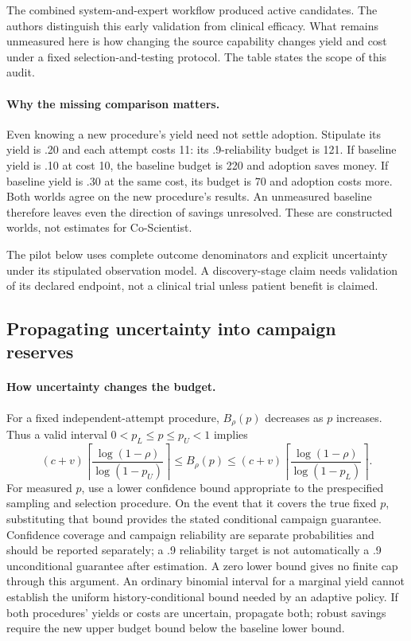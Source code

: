 The combined system-and-expert workflow produced active candidates. The authors distinguish this early validation from clinical efficacy. What remains unmeasured here is how changing the source capability changes yield and cost under a fixed selection-and-testing protocol. The table states the scope of this audit.

\paragraph{Why the missing comparison matters.}
Even knowing a new procedure's yield need not settle adoption. Stipulate its yield is .20 and each attempt costs 11: its .9-reliability budget is 121. If baseline yield is .10 at cost 10, the baseline budget is 220 and adoption saves money. If baseline yield is .30 at the same cost, its budget is 70 and adoption costs more. Both worlds agree on the new procedure's results. An unmeasured baseline therefore leaves even the direction of savings unresolved. These are constructed worlds, not estimates for Co-Scientist.

The pilot below uses complete outcome denominators and explicit uncertainty under its stipulated observation model. A discovery-stage claim needs validation of its declared endpoint, not a clinical trial unless patient benefit is claimed.


\subsection{Propagating uncertainty into campaign reserves}
\label{app:yield}
\paragraph{How uncertainty changes the budget.}
For a fixed independent-attempt procedure, $B_\rho(p)$ decreases as $p$ increases. Thus a valid interval $0<p_L\le p\le p_U<1$ implies
\begin{equation}
 (c+v)\left\lceil\frac{\log(1-\rho)}{\log(1-p_U)}\right\rceil
 \le B_\rho(p)\le
 (c+v)\left\lceil\frac{\log(1-\rho)}{\log(1-p_L)}\right\rceil.
 \label{eq:yieldinterval}
\end{equation}
For measured $p$, use a lower confidence bound appropriate to the prespecified sampling and selection procedure. On the event that it covers the true fixed $p$, substituting that bound provides the stated conditional campaign guarantee. Confidence coverage and campaign reliability are separate probabilities and should be reported separately; a .9 reliability target is not automatically a .9 unconditional guarantee after estimation. A zero lower bound gives no finite cap through this argument. An ordinary binomial interval for a marginal yield cannot establish the uniform history-conditional bound needed by an adaptive policy. If both procedures' yields or costs are uncertain, propagate both; robust savings require the new upper budget bound below the baseline lower bound.

